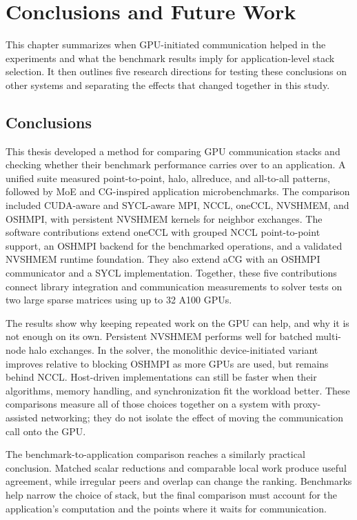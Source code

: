 \chapter{Conclusions and Future Work}\label{ch:m-conclusion}

This chapter summarizes when GPU-initiated communication helped in the experiments and what the benchmark results imply for application-level stack selection. It then outlines five research directions for testing these conclusions on other systems and separating the effects that changed together in this study.

\section{Conclusions}

This thesis developed a method for comparing GPU communication stacks and checking whether their benchmark performance carries over to an application. A unified suite measured point-to-point, halo, allreduce, and all-to-all patterns, followed by MoE and CG-inspired application microbenchmarks. The comparison included CUDA-aware and SYCL-aware MPI, NCCL, oneCCL, NVSHMEM, and OSHMPI, with persistent NVSHMEM kernels for neighbor exchanges. The software contributions extend oneCCL with grouped NCCL point-to-point support, an OSHMPI backend for the benchmarked operations, and a validated NVSHMEM runtime foundation. They also extend aCG with an OSHMPI communicator and a SYCL implementation. Together, these five contributions connect library integration and communication measurements to solver tests on two large sparse matrices using up to 32 A100 GPUs.

The results show why keeping repeated work on the GPU can help, and why it is not enough on its own. Persistent NVSHMEM performs well for batched multi-node halo exchanges. In the solver, the monolithic device-initiated variant improves relative to blocking OSHMPI as more GPUs are used, but remains behind NCCL. Host-driven implementations can still be faster when their algorithms, memory handling, and synchronization fit the workload better. These comparisons measure all of those choices together on a system with proxy-assisted networking; they do not isolate the effect of moving the communication call onto the GPU.

The benchmark-to-application comparison reaches a similarly practical conclusion. Matched scalar reductions and comparable local work produce useful agreement, while irregular peers and overlap can change the ranking. Benchmarks help narrow the choice of stack, but the final comparison must account for the application's computation and the points where it waits for communication.

